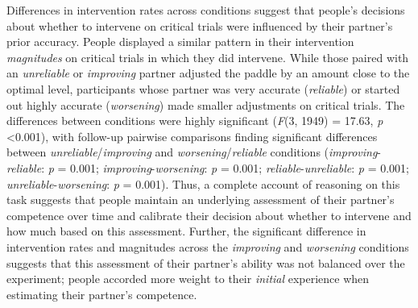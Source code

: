 \documentclass[10pt,letterpaper]{article}
\begin{document}
Differences in intervention rates across conditions suggest that people's decisions about whether to intervene on critical trials were influenced by their partner's prior accuracy. People displayed a similar pattern in their intervention \textit{magnitudes} on critical trials in which they did intervene. While those paired with an \textit{unreliable} or \textit{improving} partner adjusted the paddle by an amount close to the optimal level, participants whose partner was very accurate (\textit{reliable}) or started out highly accurate (\textit{worsening}) made smaller adjustments on critical trials. The differences between conditions were highly significant (\textit{F}(3, 1949) = 17.63, \textit{p} \textless{0.001}), with follow-up pairwise comparisons finding significant differences between \textit{unreliable}/\textit{improving} and \textit{worsening}/\textit{reliable} conditions (\textit{improving}-\textit{reliable}: \textit{p} = 0.001; \textit{improving}-\textit{worsening}: \textit{p} = 0.001; \textit{reliable}-\textit{unreliable}: \textit{p} = 0.001; \textit{unreliable}-\textit{worsening}: \textit{p} = 0.001). Thus, a complete account of reasoning on this task suggests that people maintain an underlying assessment of their partner's competence over time and calibrate their decision about whether to intervene and how much based on this assessment. Further, the significant difference in intervention rates and magnitudes across the \textit{improving} and \textit{worsening} conditions suggests that this assessment of their partner's ability was not balanced over the experiment; people accorded more weight to their \textit{initial} experience when estimating their partner's competence.



\end{document}

